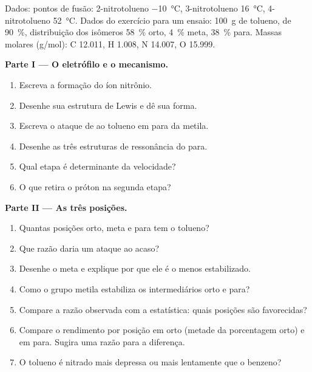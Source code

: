 \begin{problem}
\label{pb:b2:aromatic-substitution:1}
Dados: pontos de fusão: 2-nitrotolueno \qty{-10}{\degreeCelsius}, 3-nitrotolueno
\qty{16}{\degreeCelsius}, 4-nitrotolueno \qty{52}{\degreeCelsius}. Dados do
exercício para um ensaio: \qty{100}{g} de tolueno,  de 90~\%,
distribuição dos isômeros 58~\% orto, 4~\% meta, 38~\% para. Massas molares
(\unit{g/mol}): C 12.011, H 1.008, N 14.007, O 15.999.

\medskip
\noindent\textbf{Parte I --- O eletrófilo e o mecanismo.}
\begin{enumerate}
  \item Escreva a formação do íon nitrônio.
  \item Desenhe sua estrutura de Lewis e dê sua forma.
  \item Escreva o ataque de  ao tolueno em para da metila.
  \item Desenhe as três estruturas de ressonância do  para.
  \item Qual etapa é determinante da velocidade?
  \item O que retira o próton na segunda etapa?
\end{enumerate}

\medskip
\noindent\textbf{Parte II --- As três posições.}
\begin{enumerate}[resume]
  \item Quantas posições orto, meta e para tem o tolueno?
  \item Que razão daria um ataque ao acaso?
  \item Desenhe o  meta e explique por que ele é o
        menos estabilizado.
  \item Como o grupo metila estabiliza os intermediários orto e para?
  \item Compare a razão observada com a estatística: quais posições são favorecidas?
  \item Compare o rendimento por posição em orto (metade da porcentagem orto)
        e em para. Sugira uma razão para a diferença.
  \item O tolueno é nitrado mais depressa ou mais lentamente que o benzeno?
\end{enumerate}


\end{problem}
